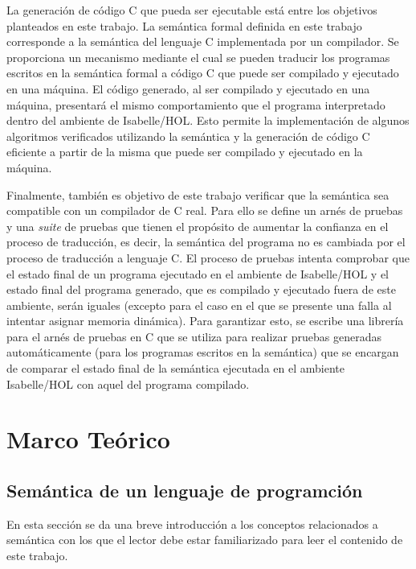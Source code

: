 La generación de código C que pueda ser ejecutable está entre los objetivos planteados en este trabajo.
La semántica formal definida en este trabajo corresponde a la semántica del lenguaje C implementada por un compilador.
Se proporciona un mecanismo mediante el cual se pueden traducir los programas escritos en la semántica formal a código C que puede ser compilado y ejecutado en una máquina.
El código generado, al ser compilado y ejecutado en una máquina, presentará el mismo comportamiento que el programa interpretado dentro del ambiente de Isabelle/HOL.
Esto permite la implementación de algunos algoritmos verificados utilizando la semántica y la generación de código C eficiente a partir de la misma que puede ser compilado y ejecutado en la máquina.

Finalmente, también es objetivo de este trabajo verificar que la semántica sea compatible con un compilador de C real.
Para ello se define un arnés de pruebas y una \textit{suite} de pruebas que tienen el propósito de aumentar la confianza en el proceso de traducción, es decir, la semántica del programa no es cambiada por el proceso de traducción a lenguaje C.
El proceso de pruebas intenta comprobar que el estado final de un programa ejecutado en el ambiente de Isabelle/HOL y el estado final del programa generado, que es compilado y ejecutado fuera de este ambiente, serán iguales (excepto para el caso en el que se presente una falla al intentar asignar memoria dinámica).
Para garantizar esto, se escribe una librería para el arnés de pruebas en C que se utiliza para realizar pruebas generadas automáticamente (para los programas escritos en la semántica) que se encargan de comparar el estado final de la semántica ejecutada en el ambiente Isabelle/HOL con aquel del programa compilado.


\section{Marco Teórico}
\begin{comment}
FIXME! no se si está bien este título.
\end{comment}

\subsection{Semántica de un lenguaje de programción}

En esta sección se da una breve introducción a los conceptos relacionados a semántica con los que el lector debe estar familiarizado para leer el contenido de este trabajo.

